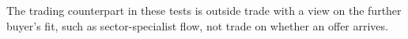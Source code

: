 
The trading counterpart in these tests is outside trade with a view
on the further buyer's fit, such as sector-specialist flow, not trade
on whether an offer arrives.
